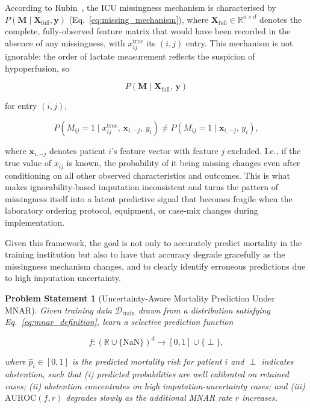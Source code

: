 \documentclass[journal]{IEEEtran}
\newtheorem*{problem}{Problem Statement}
\begin{document}
	According to Rubin~\cite{rubin1976inference}, the ICU missingness mechanism is characterised by
	$P(\mathbf{M}\mid\mathbf{X}_{\text{full}},\mathbf{y})$
	(Eq.~\ref{eq:missing_mechanism}), where $\mathbf{X}_{\text{full}}\in\mathbb{R}^{n\times d}$ denotes the complete, fully-observed feature matrix that would have been recorded in the absence of any missingness, with $x^{\text{true}}_{ij}$ its $(i,j)$ entry. This mechanism is not ignorable: the order of lactate measurement reflects the suspicion of hypoperfusion, so
	
	\begin{equation}
		P(\mathbf{M}\mid\mathbf{X}_{\text{full}},\,\mathbf{y})
		\label{eq:missing_mechanism}
	\end{equation}
	
	for entry $(i,j)$,
	
	\begin{equation}
		P(M_{ij}=1\mid x^{\text{true}}_{ij},\,\mathbf{x}_{i,-j},\,y_i)
		\neq
		P(M_{ij}=1\mid\mathbf{x}_{i,-j},\,y_i),
		\label{eq:mnar_definition}
	\end{equation}
	
	\noindent where $\mathbf{x}_{i,-j}$ denotes patient $i$'s feature vector with feature $j$ excluded. I.e., if the true value of $x_{ij}$ is known, the probability of it being missing changes even after conditioning on all other observed characteristics and outcomes. This is what makes ignorability-based imputation inconsistent and turns the pattern of missingness itself into a latent predictive signal that becomes fragile when the laboratory ordering protocol, equipment, or case-mix changes during implementation.
	
	Given this framework, the goal is not only to accurately predict mortality in the training institution but also to have that accuracy degrade gracefully as the missingness mechanism changes, and to clearly identify erroneous predictions due to high imputation uncertainty.
	
	\begin{problem}[Uncertainty-Aware Mortality Prediction Under MNAR]
		\label{prob:main}
		Given training data $\mathcal{D}_{\text{train}}$ drawn from a distribution satisfying Eq.~\ref{eq:mnar_definition}, learn a selective prediction function
		
		\begin{equation}
			f:(\mathbb{R}\cup\{\text{NaN}\})^d\rightarrow[0,1]\cup\{\perp\},
			\label{eq:selective_fn}
		\end{equation}
		
		\noindent where $\hat{p}_i\in[0,1]$ is the predicted mortality risk for patient $i$ and $\perp$ indicates abstention, such that (i) predicted probabilities are well calibrated on retained cases; (ii) abstention concentrates on high imputation-uncertainty cases; and (iii) $\text{AUROC}(f,r)$ degrades slowly as the additional MNAR rate $r$ increases.
	\end{problem}
	
\end{document}
